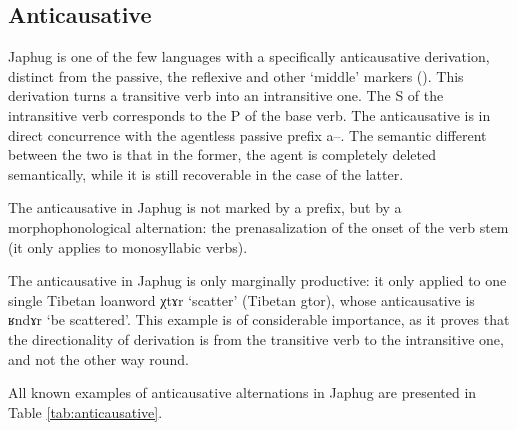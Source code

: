 \documentclass[oldfontcommands,oneside,a4paper,11pt]{article}
\newcommand{\ipa}[1]{{\phon \mbox{#1}}} %
\begin{document}
\subsection{Anticausative}
Japhug is one of the few languages with a specifically anticausative derivation, distinct from the passive, the reflexive and other `middle' markers (\citealt{jacques12demotion}). This derivation turns a transitive verb into an intransitive one. The S of the intransitive verb corresponds to the P of the base verb. The anticausative is in direct concurrence with the agentless passive prefix \ipa{a--}. The semantic different between the two is that in the former, the agent is completely deleted semantically, while it is still recoverable in the case of the latter.

The anticausative in Japhug is not marked by a prefix, but by a morphophonological alternation: the prenasalization of the onset of the verb stem (it only applies to monosyllabic verbs).
 
The anticausative in Japhug is only marginally productive: it only applied to one single Tibetan loanword \ipa{χtɤr} `scatter' (Tibetan \ipa{gtor}), whose anticausative is \ipa{ʁndɤr} `be scattered'. This example is of considerable importance, as it proves that the directionality of derivation is from the transitive verb to the intransitive one, and not the other way round. 

All known examples of anticausative alternations  in Japhug are presented in Table \ref{tab:anticausative}.
 
\end{document}
